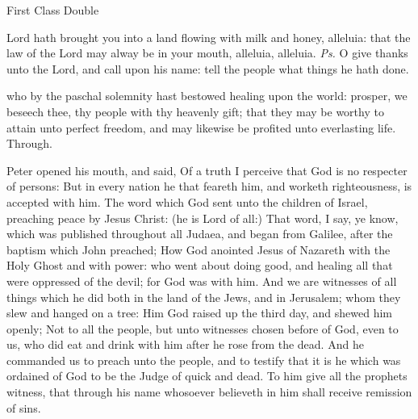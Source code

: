 \begin{inhead}
    {First Class Double}
\end{inhead}
\par\noindent
{}


\properantiphonfix

\introit
{} Lord hath brought you into a land flowing with milk and honey, alleluia: that the law of the Lord may alway be in your mouth, alleluia, alleluia. \textit{Ps.} O give thanks unto the Lord, and call upon his name: tell the people what things he hath done.

\collect
 who by the paschal solemnity hast bestowed healing upon the world: prosper, we beseech thee, thy people with thy heavenly gift; that they may be worthy to attain unto perfect freedom, and may likewise be profited unto everlasting life. Through.

 Peter opened his mouth, and said, Of a truth I perceive that God is no respecter of persons: But in every nation he that feareth him, and worketh righteousness, is accepted with him. The word which God sent unto the children of Israel, preaching peace by Jesus Christ: (he is Lord of all:) That word, I say, ye know, which was published throughout all Judaea, and began from Galilee, after the baptism which John preached; How God anointed Jesus of Nazareth with the Holy Ghost and with power: who went about doing good, and healing all that were oppressed of the devil; for God was with him. And we are witnesses of all things which he did both in the land of the Jews, and in Jerusalem; whom they slew and hanged on a tree: Him God raised up the third day, and shewed him openly; Not to all the people, but unto witnesses chosen before of God, even to us, who did eat and drink with him after he rose from the dead. And he commanded us to preach unto the people, and to testify that it is he which was ordained of God to be the Judge of quick and dead. To him give all the prophets witness, that through his name whosoever believeth in him shall receive remission of sins.

